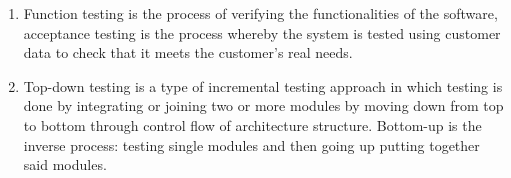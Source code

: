 \begin{parlist}
\begin{enumerate}
			\item Function testing is the process of verifying the functionalities of the software,  acceptance testing is the process whereby the system is tested using customer data to check that it meets the customer’s real needs.\cite{Sommerville:2004aa}
			\item Top-down testing is a type of incremental testing approach in which testing is done by integrating or joining two or more modules by moving down from top to bottom through control flow of architecture structure. Bottom-up is the inverse process: testing single modules and then going up putting together said modules.\cite{geeksTopBottom}
		\end{enumerate}
\end{parlist}